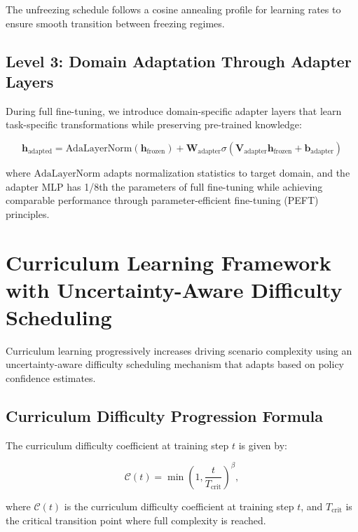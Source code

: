 \documentclass[10pt,twocolumn,letterpaper]{article}
\begin{document}
The unfreezing schedule follows a cosine annealing profile for learning rates to ensure smooth transition between freezing regimes.

\subsection{Level 3: Domain Adaptation Through Adapter Layers}

During full fine-tuning, we introduce domain-specific adapter layers that learn task-specific transformations while preserving pre-trained knowledge:

\begin{equation}
    \mathbf{h}_\text{adapted} = \text{AdaLayerNorm}(\mathbf{h}_\text{frozen}) + \mathbf{W}_\text{adapter}\sigma(\mathbf{V}_\text{adapter}\mathbf{h}_\text{frozen} + \mathbf{b}_\text{adapter})
    \label{eq:adapter_layers}
\end{equation}

where $\text{AdaLayerNorm}$ adapts normalization statistics to target domain, and the adapter MLP has 1/8th the parameters of full fine-tuning while achieving comparable performance through parameter-efficient fine-tuning (PEFT) principles.

\section{Curriculum Learning Framework with Uncertainty-Aware Difficulty Scheduling}

Curriculum learning progressively increases driving scenario complexity using an uncertainty-aware difficulty scheduling mechanism that adapts based on policy confidence estimates.

\subsection{Curriculum Difficulty Progression Formula}

The curriculum difficulty coefficient at training step $t$ is given by:

\begin{equation}
    \mathcal{C}(t) = \min\left(1,\frac{t}{T_\text{crit}}\right)^{\beta},
    \label{eq:curriculum_formula}
\end{equation}

where $\mathcal{C}(t)$ is the curriculum difficulty coefficient at training step $t$, and $T_\text{crit}$ is the critical transition point where full complexity is reached.
\end{document}
